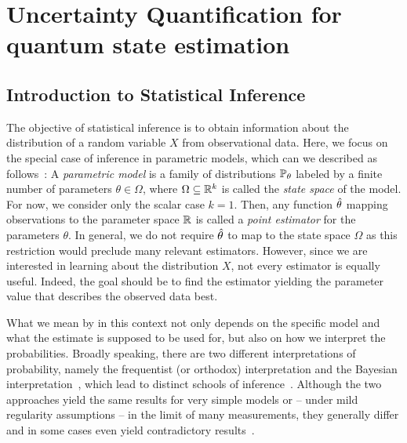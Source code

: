\chapter{Uncertainty Quantification for quantum state estimation}
\label{chap:error}





\section{Introduction to Statistical Inference}
\label{sec:error.intro}

The objective of statistical inference is to obtain information about the distribution of a random variable $X$ from observational data.
Here, we focus on the special case of inference in parametric models, which can we described as follows~\cite{Wasserman_2013_All}:
A \emph{parametric model} is a family of distributions $\mathbb{P}_\theta$ labeled by a finite number of parameters $\theta \in \Omega$, where $\Omega \subseteq \mathbb{R}^k$ is called the \emph{state space} of the model.
For now, we consider only the scalar case $k=1$.
Then, any function $\hat{\theta}$ mapping observations to the parameter space $\mathbb{R}$ is called a \emph{point estimator} for the parameters $\theta$.
In general, we do not require $\hat{\theta}$ to map to the state space $\Omega$ as this restriction would preclude many relevant estimators.
However, since we are interested in learning about the distribution $X$, not every estimator is equally useful.
Indeed, the goal should be to find the estimator yielding the parameter value that describes the observed data best.

What we mean by  in this context not only depends on the specific model and what the estimate is supposed to be used for, but also on how we interpret the probabilities.
Broadly speaking, there are two different interpretations of probability, namely the frequentist (or orthodox) interpretation and the Bayesian interpretation~\cite{Hajek_2012_Interpretations,Caves_2000_Probabilities}, which lead to distinct schools of inference~\cite{Kiefer_2012_Introduction,Bolstad_2007_Introduction,Wasserman_2013_All}.
Although the two approaches yield the same results for very simple models or -- under mild regularity assumptions -- in the limit of many measurements, they generally differ and in some cases even yield contradictory results~\cite[Sec. 11.9]{Wasserman_2013_All}.

